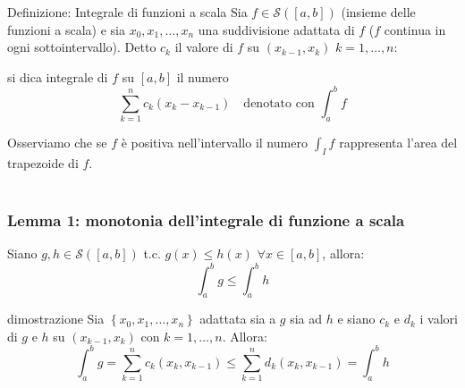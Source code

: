 \documentclass[x11names]{article}
\begin{document}
		\begin{center}
		\colorbox{myblue}{\begin{minipage}{5.75in}
				\begin{blues}{Definizione: Integrale di funzioni a scala}
					Sia $f \in \mathcal{S}\left(\left[a,b\right]\right)$ (insieme delle funzioni a scala) e sia $x_0, x_1, \dots, x_n$ una suddivisione adattata di $f$ ($f$ continua in ogni sottointervallo).  Detto $c_k$ il valore di $f$ su $\left(x_{k-1}, x_k\right)$ $k=1,\dots,n$:
					
					si dica integrale di $f$ su $\left[a,b\right]$ il numero
					\[
					\sum_{k=1}^{n}c_k (x_k - x_{k-1}) \quad \text{denotato con } \int_{a}^{b}f
					\]
				\end{blues}
		\end{minipage}}       
	\end{center}
	Osserviamo che se $f$ è positiva nell'intervallo il numero $\int_{I}^{}f$ rappresenta l'area del trapezoide di $f$.  \\ \\
	
	\begin{center}
		\colorbox{myred}{\begin{minipage}{5.75in}
				\begin{redes}{}
					\subsubsection{Lemma 1: monotonia dell'integrale di funzione a scala}
					Siano $g,h \in \mathcal{S}\left(\left[a,b\right]\right)$ t.c. $g(x) \leq h(x)$ $\forall x \in \left[a,b\right]$, allora:
					\[
					\int_{a}^{b}g \leq \int_{a}^{b}h 
					\]
				\end{redes}
		\end{minipage}}        
	\end{center}
	\begin{es}{dimostrazione}
		Sia $\left\{x_0, x_1, \dots, x_n\right\}$ adattata sia a $g$ sia ad $h$ e siano $c_k$ e $d_k$ i valori di $g$ e $h$ su $\left(x_{k-1},x_k\right)$ con $k=1,\dots,n$. Allora:
		\[
		\int_{a}^{b}g = \sum_{k=1}^n c_k\left(x_k,x_{k-1}\right) \leq \sum_{k=1}^n d_k\left(x_k,x_{k-1}\right) = \int_{a}^{b}h 
		\]
	\end{es}
\end{document}
